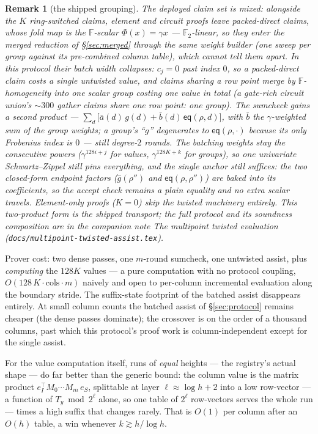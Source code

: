 \documentclass[11pt]{article}
\newcommand{\F}{\mathbb{F}}
\newcommand{\Ftwo}{\F_2}
\newcommand{\eq}{\mathsf{eq}}
\newtheorem{remark}[theorem]{Remark}
\begin{document}
\begin{remark}[the shipped grouping]\label{rem:grouping}
The deployed claim set is mixed: alongside the $K$ ring-switched
claims, element and circuit proofs leave \emph{packed-direct} claims,
whose fold map is the $\F$-scalar $\Phi(x) = \gamma x$ ---
$\Ftwo$-linear, so they enter the merged reduction of
\S\ref{sec:merged} through the same weight builder (one sweep per
group against its pre-combined column table), which cannot tell them
apart. In this protocol their batch width
collapses: $c_j = 0$ past index $0$, so a packed-direct claim costs a
single \emph{untwisted} value, and claims sharing a row point merge by
$\F$-homogeneity into one \emph{scalar group} costing one value in
total (a gate-rich circuit union's ${\sim}300$ gather claims share one
row point: one group). The sumcheck gains a second product ---
$\sum_d \bigl[\bar a(d)\, g(d) + \bar b(d)\, \eq(\rho, d)\bigr]$, with
$\bar b$ the $\gamma$-weighted sum of the group weights; a group's
``$g$'' degenerates to $\eq(\rho, \cdot)$ because its only Frobenius
index is $0$ --- still degree-$2$ rounds. The batching weights stay
the consecutive powers ($\gamma^{128 i + j}$ for values,
$\gamma^{128 K + k}$ for groups), so one univariate Schwartz--Zippel
still pins everything, and the single anchor still suffices: the two
closed-form endpoint factors ($\hat g(\rho'')$ and
$\eq(\rho, \rho'')$) are baked into its coefficients, so the accept
check remains a plain equality and no extra scalar travels.
Element-only proofs ($K = 0$) skip the twisted machinery entirely.
This two-product form is the shipped transport; the full protocol and
its soundness composition are in the companion note \emph{The
multipoint twisted evaluation}
(\texttt{docs/multipoint-twisted-assist.tex}).
\end{remark}

Prover cost: two dense passes, one $m$-round sumcheck, one untwisted
assist, plus \emph{computing} the $128 K$ values --- a pure
computation with no protocol coupling, $O(128\,K \cdot \mathrm{cols}
\cdot m)$ naively and open to per-column incremental evaluation along
the boundary stride. The suffix-state footprint of the batched assist
disappears entirely. At small column counts the batched assist of
\S\ref{sec:protocol} remains cheaper (the dense passes dominate);
the crossover is on the order of a thousand columns, past which this
protocol's proof work is column-independent except for the single
assist.

For the value computation itself, runs of \emph{equal} heights ---
the registry's actual shape --- do far better than the generic bound:
the column value is the matrix product
$e_I^{\!\top} M_0 \cdots M_m\, e_S$, splittable at layer
$\ell \approx \log h + 2$ into a low row-vector --- a function of
$T_y \bmod 2^\ell$ alone, so one table of $2^\ell$ row-vectors serves
the whole run --- times a high suffix that changes rarely. That is
$O(1)$ per column after an $O(h)$ table, a win whenever
$k \gtrsim h/\log h$.
\end{document}
